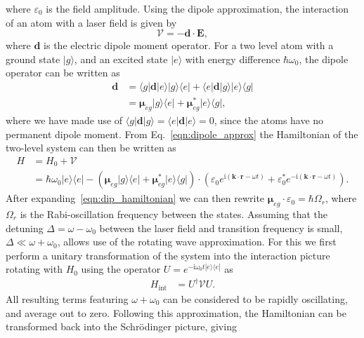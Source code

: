 where $\varepsilon_0$ is the field amplitude. Using the dipole approximation, the interaction of an atom with a laser field is given by~\cite{BK:Foot_2005}
\begin{equation}
\mathcal{V} = -{\mathbf{d}}\cdot {\mathbf{E}},
\end{equation}
where ${\mathbf{d}}$ is the electric dipole moment operator. For a two level atom with a ground state $| g \rangle$, and an excited state $| e \rangle$ with energy difference $\hbar \omega_0$, the dipole operator can be written as
\begin{align}\label{eqn:dipole_approx}
\mathbf{d} &= \langle g|\mathbf{d}|e \rangle | g \rangle \langle e | + \langle e|\mathbf{d}|g \rangle | e \rangle \langle g | \nonumber \\
&= \boldsymbol{\mu}_{eg} | g \rangle \langle e | + \boldsymbol{\mu}_{eg}^{*} | e \rangle \langle g |,
\end{align}
where we have made use of $\langle g|\mathbf{d}|g \rangle = \langle e|\mathbf{d}|e \rangle  = 0$, since the atoms have no permanent dipole moment. From Eq.~\eqref{eqn:dipole_approx} the Hamiltonian of the two-level system can then be written as
\begin{align}\label{eqn:dip_hamiltonian}
    H &= H_0  + \mathcal{V} \nonumber \\
      &=  \hbar\omega_0 |e\rangle\langle e | - (\boldsymbol{\mu}_{eg} | g \rangle \langle e | + \boldsymbol{\mu}_{eg}^{*} | e \rangle \langle g |)\cdot ( \varepsilon_0 e^{\textrm{i}\left(\mathbf{k}\cdot\mathbf{r} - \omega t\right)} +  \varepsilon_0^{*} e^{-\textrm{i}\left(\mathbf{k}\cdot\mathbf{r} - \omega t\right)}).
\end{align}
After expanding~\eqref{eqn:dip_hamiltonian} we can then rewrite $\boldsymbol{\mu}_{eg}\cdot \varepsilon_0 = \hbar\Omega_r$, where $\Omega_r$ is the Rabi-oscillation frequency between the states. Assuming that the detuning $\Delta = \omega - \omega_0$ between the laser field and transition frequency is small, $\Delta \ll \omega + \omega_0$, allows use of the rotating wave approximation. For this we first perform a unitary transformation of the system into the interaction picture rotating with $H_0$ using the operator $U = e^{-\textrm{i}\omega_0 t|e\rangle\langle e|}$ as
\begin{align}
    H_{\textrm{int}} & = U^{\dagger} \mathcal{V} U.
\end{align}
All resulting terms featuring $\omega + \omega_0$ can be considered to be rapidly oscillating, and average out to zero. Following this approximation, the Hamiltonian can be transformed back into the Schr\"odinger picture, giving
